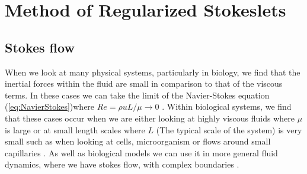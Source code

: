 \section{Method of Regularized Stokeslets}
\subsection{Stokes flow}
When we look at many physical systems, particularly in biology, we find that the inertial forces within the fluid are small in comparison to that of the viscous terms. In these cases we can take the limit of the Navier-Stokes equation (\cref{eq:NavierStokes})where $R e=\rho u L/\mu \to 0 $ \cite{Trombley2019BasicFlows}. Within biological systems, we find that these cases occur when we are either looking at highly viscous fluids where $\mu$ is large or at small length scales where $L$ (The typical scale of the system) is very small such as when looking at cells, microorganism or flows around small capillaries \cite{Blake1972AOrganisms, Higdon1979APropulsion, Smith2009MathematicalFluids}. As well as biological models we can use it in more general fluid dynamics, where we have stokes flow, with complex boundaries \cite{Liron1978StokesPipe, Liron1976StokesPlates}.


